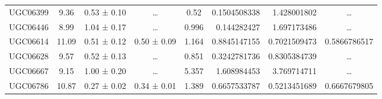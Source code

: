 \documentclass[reprint,%
 amsmath,amssymb,
 aps,
]{revtex4-1}
\begin{document}
\begin{table}[]
\begin{tabular}{cccccrrc}
\rowcolor[HTML]{F3F3F3} 
UGC06399             & 9.36                      & 0.53 ± 0.10           & …                      & 0.52                                                         & 0.1504508338                                                          & 1.428001802                                                           & …                                                             \\
\rowcolor[HTML]{F3F3F3} 
UGC06446             & 8.99                      & 1.04 ± 0.17           & …                      & 0.996                                                        & 0.144282427                                                           & 1.697173486                                                           & …                                                             \\
\rowcolor[HTML]{F3F3F3} 
UGC06614             & 11.09                     & 0.51 ± 0.12           & 0.50 ± 0.09            & 1.164                                                        & 0.8845147155                                                          & 0.7021509473                                                          & \multicolumn{1}{r}{\cellcolor[HTML]{F3F3F3}0.5866786517}      \\
\rowcolor[HTML]{F3F3F3} 
UGC06628             & 9.57                      & 0.52 ± 0.13           & …                      & 0.851                                                        & 0.3242781736                                                          & 0.8305384739                                                          & …                                                             \\
\rowcolor[HTML]{F3F3F3} 
UGC06667             & 9.15                      & 1.00 ± 0.20           & …                      & 5.357                                                        & 1.608984453                                                           & 3.769714711                                                           & …                                                             \\
\rowcolor[HTML]{F3F3F3} 
UGC06786             & 10.87                     & 0.27 ± 0.02           & 0.34 ± 0.01            & 1.389                                                        & 0.6657533787                                                          & 0.5213451689                                                          & \multicolumn{1}{r}{\cellcolor[HTML]{F3F3F3}0.6667679805}      \\

\end{tabular}
\end{table}
\end{document}
